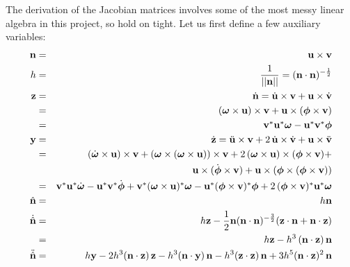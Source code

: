 The derivation of the Jacobian matrices involves some of the most messy linear algebra in this
project, so hold on tight. Let us first define a few auxiliary variables:
\begin{eqnarray}
\ve{n} & = & \ve{u}\times\ve{v} \\
h &=& \frac{1}{\norm{\ve{n}}} = (\ve{n}\cdot\ve{n})^{-\frac{1}{2}} \\
\ve{z} &=& \dot{\ve{n}} = \dot{\ve{u}}\times\ve{v} + \ve{u}\times\dot{\ve{v}} \nonumber\\*
    &=& (\ve{\omega}\times\ve{u})\times\ve{v} + \ve{u}\times(\ve{\phi}\times\ve{v}) \nonumber\\*
    &=& \dual{\ve{v}}\dual{\ve{u}}\ve{\omega} - \dual{\ve{u}}\dual{\ve{v}}\ve{\phi} \\
\ve{y} &=& \dot{\ve{z}} = \ddot{\ve{u}}\times\ve{v} + 2\,\dot{\ve{u}}\times\dot{\ve{v}} +
        \ve{u}\times\ddot{\ve{v}} \nonumber\\*
    &=& (\dot{\ve{\omega}}\times\ve{u})\times\ve{v} +
        (\ve{\omega}\times(\ve{\omega}\times\ve{u}))\times\ve{v} +
        2\,(\ve{\omega}\times\ve{u})\times(\ve{\phi}\times\ve{v}) + \nonumber\\*&&
        \ve{u}\times(\dot{\ve{\phi}}\times\ve{v}) +
        \ve{u}\times(\ve{\phi}\times(\ve{\phi}\times\ve{v})) \\*
    &=& \dual{\ve{v}}\dual{\ve{u}}\dot{\ve{\omega}} - \dual{\ve{u}}\dual{\ve{v}}\dot{\ve{\phi}} +
        \dual{\ve{v}}\dual{(\ve{\omega}\times\ve{u})}\ve{\omega} -
        \dual{\ve{u}}\dual{(\ve{\phi}\times\ve{v})}\ve{\phi} +
        2\,\dual{(\ve{\phi}\times\ve{v})}\dual{\ve{u}}\ve{\omega} \nonumber\\
\hat{\ve{n}} & = & h\ve{n} \\
\dot{\hat{\ve{n}}} & = & h\ve{z} - \frac{1}{2}\ve{n}(\ve{n}\cdot\ve{n})^{-\frac{3}{2}}
        (\ve{z}\cdot\ve{n} + \ve{n}\cdot\ve{z}) \nonumber\\*
    &=& h\ve{z} - h^3\,(\ve{n}\cdot\ve{z})\,\ve{n} \\
\ddot{\hat{\ve{n}}} & = & h\ve{y} - 2h^3 (\ve{n}\cdot\ve{z})\,\ve{z} -
        h^3 (\ve{n}\cdot\ve{y})\,\ve{n}
        -h^3 (\ve{z}\cdot\ve{z})\,\ve{n} + 3h^5 (\ve{n}\cdot\ve{z})^2\,\ve{n}
\end{eqnarray}

